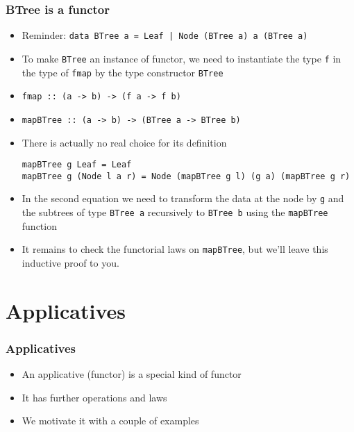 \documentclass{beamer}
\begin{document}
\begin{frame}[fragile]
  \frametitle{BTree is a functor}
  \begin{itemize}[<+->]
  \item Reminder:
    \lstinline$data BTree a = Leaf | Node (BTree a) a (BTree a)$
  \item To make \lstinline$BTree$ an instance of functor, we need to instantiate
    the type \lstinline$f$ in the type of \lstinline|fmap| by the type constructor
    \lstinline|BTree|
  \item \lstinline|fmap :: (a -> b) -> (f a -> f b)|
  \item \lstinline|mapBTree :: (a -> b) -> (BTree a -> BTree b)|
  \item There is actually no real choice for its definition
\begin{lstlisting}
mapBTree g Leaf = Leaf
mapBTree g (Node l a r) = Node (mapBTree g l) (g a) (mapBTree g r)
\end{lstlisting}
  \item In the second equation we need to transform the data at the
    node by \lstinline$g$ and the subtrees of type
    \lstinline$BTree a$ recursively to \lstinline$BTree b$ using the
    \lstinline$mapBTree$ function
  \item It remains to check the functorial laws on
    \lstinline|mapBTree|, but we'll leave this inductive proof to you.
  \end{itemize}
\end{frame}

\section{Applicatives}
\begin{frame}
  \frametitle{Applicatives}
  \begin{itemize}
  \item An applicative (functor) is a special kind of functor
  \item It has further operations and laws
  \item We motivate it with a couple of examples
  \end{itemize}
\end{frame}
\end{document}
